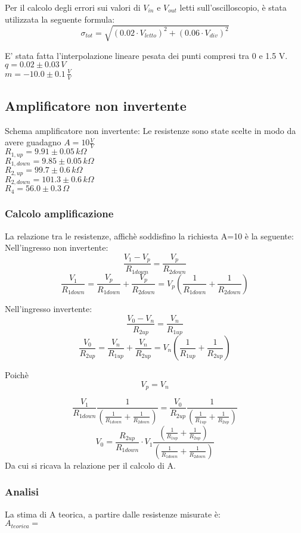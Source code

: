 Per il calcolo degli errori sui valori di $V_{in}$ e $V_{out}$ letti sull'oscilloscopio, è stata utilizzata la seguente formula:
$$\sigma_{tot}=\sqrt{ (0.02\cdot V_{letto})^2 + (0.06 \cdot V_{div})^2}$$

E' stata fatta l'interpolazione lineare pesata dei punti compresi tra 0 e 1.5 V.\\
$q = 0.02 \pm 0.03 \,V$\\
$m = -10.0 \pm 0.1 \, \frac{V}{V}$




\subsection{Amplificatore non invertente}

Schema amplificatore non invertente:
Le resistenze sono state scelte in modo da avere guadagno $A=10 \frac{V}{V}$\\
$R_{1,up}=9.91 \pm0.05 \,k\Omega $\\ %
$R_{1,down}=9.85 \pm 0.05\,k\Omega$\\ %
$R_{2,up}=99.7 \pm 0.6\,k\Omega$\\ %
$R_{2,down}=101.3 \pm 0.6\,k\Omega$\\
$R_4=56.0 \pm 0.3\,\Omega$

\subsubsection{Calcolo amplificazione}
La relazione tra le resistenze, affichè soddisfino la richiesta A=10 è la seguente:
Nell'ingresso non invertente:
$$\frac{V_1-V_p}{R_{1down}}=\frac{V_p}{R_{2down}}$$
$$\frac{V_1}{R_{1down}}=\frac{V_p}{R_{1down}}+\frac{V_p}{R_{2down}}=V_p \left(\frac{1}{R_{1down}}+\frac{1}{R_{2down}}\right)$$

Nell'ingresso invertente:
$$\frac{V_0-V_n}{R_{2up}}=\frac{V_n}{R_{1up}}$$
$$\frac{V_0}{R_{2up}}=\frac{V_n}{R_{1up}}+\frac{V_n}{R_{2up}}=V_n \left(\frac{1}{R_{1up}}+\frac{1}{R_{2up}}\right)$$

Poichè 
$$V_p=V_n$$

$$\frac{V_1}{R_{1down}} \frac{1}{\left(\frac{1}{R_{1down}}+\frac{1}{R_{2down} }\right)}=\frac{V_0}{R_{2up}} \frac{1}{\left(\frac{1}{R_{1up}}+\frac{1}{R_{2up}} \right)}$$
$$V_0=\frac{R_{2up}}{R_{1down}} \cdot V_1 \frac{\left(\frac{1}{R_{1up}}+\frac{1}{R_{2up} }\right)}{\left(\frac{1}{R_{1down}}+\frac{1}{R_{2down}} \right)}$$
Da cui si ricava la relazione per il calcolo di A.
\subsubsection{Analisi}
La stima di A teorica, a partire dalle resistenze misurate è:\\
$A_{teorica}=$ %

